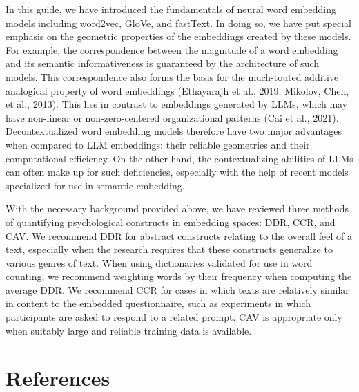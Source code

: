 \documentclass[
  man,
  floatsintext,
  longtable,
  nolmodern,
  notxfonts,
  notimes,
  colorlinks=true,linkcolor=blue,citecolor=blue,urlcolor=blue]{apa7}
\begin{document}
In this guide, we have introduced the fundamentals of neural word
embedding models including word2vec, GloVe, and fastText. In doing so,
we have put special emphasis on the geometric properties of the
embeddings created by these models. For example, the correspondence
between the magnitude of a word embedding and its semantic
informativeness is guaranteed by the architecture of such models. This
correspondence also forms the basis for the much-touted additive
analogical property of word embeddings (Ethayarajh et al., 2019;
Mikolov, Chen, et al., 2013). This lies in contrast to embeddings
generated by LLMs, which may have non-linear or non-zero-centered
organizational patterns (Cai et al., 2021). Decontextualized word
embedding models therefore have two major advantages when compared to
LLM embeddings: their reliable geometries and their computational
efficiency. On the other hand, the contextualizing abilities of LLMs can
often make up for such deficiencies, especially with the help of recent
models specialized for use in semantic embedding.

With the necessary background provided above, we have reviewed three
methods of quantifying psychological constructs in embedding spaces:
DDR, CCR, and CAV. We recommend DDR for abstract constructs relating to
the overall feel of a text, especially when the research requires that
these constructs generalize to various genres of text. When using
dictionaries validated for use in word counting, we recommend weighting
words by their frequency when computing the average DDR. We recommend
CCR for cases in which texts are relatively similar in content to the
embedded questionnaire, such as experiments in which participants are
asked to respond to a related prompt. CAV is appropriate only when
suitably large and reliable training data is available.

\section{References}\label{references}
\end{document}
